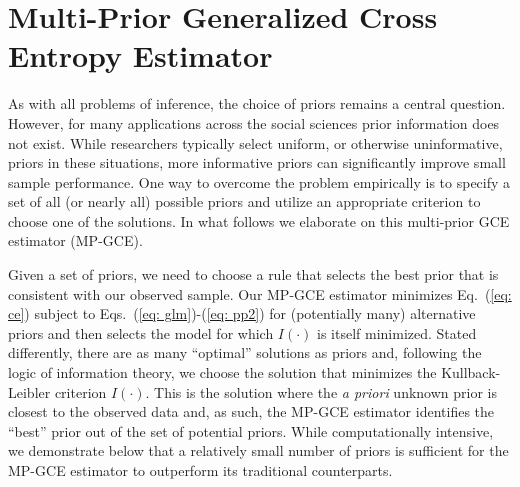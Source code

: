 \documentclass{elsarticle}
\begin{document}

\section{Multi-Prior Generalized Cross Entropy Estimator}
\label{sec: mp-gce}

As with all problems of inference, the choice of priors remains a central question.
However, for many applications across the social sciences prior information 
does not exist. 
While researchers typically select uniform, or otherwise uninformative, priors in these 
situations, more informative priors can significantly improve small sample performance.
One way to overcome the problem empirically is to specify a set of all (or 
nearly all) possible priors and utilize an appropriate criterion to choose one of 
the solutions.
In what follows we elaborate on this multi-prior GCE estimator (MP-GCE).

Given a set of priors, we need to choose a rule that selects the best prior that is 
consistent with our observed sample. 
Our MP-GCE estimator minimizes Eq.\ (\ref{eq: ce}) subject to 
Eqs.\ (\ref{eq: glm})-(\ref{eq: pp2}) for (potentially many) alternative priors and then 
selects the model for which $I(\cdot)$ is itself minimized. 
Stated differently, there are as many ``optimal'' solutions as priors and, following the logic 
of information theory, we choose the solution that minimizes the Kullback-Leibler criterion 
$I(\cdot)$. 
This is the solution where the \emph{a priori} unknown prior is closest to the observed 
data and, as such, the MP-GCE estimator identifies the ``best'' prior out of the 
set of potential priors. 
While computationally intensive, we demonstrate below that a relatively small 
number of priors is sufficient for the MP-GCE estimator to outperform its 
traditional counterparts.
\end{document}

